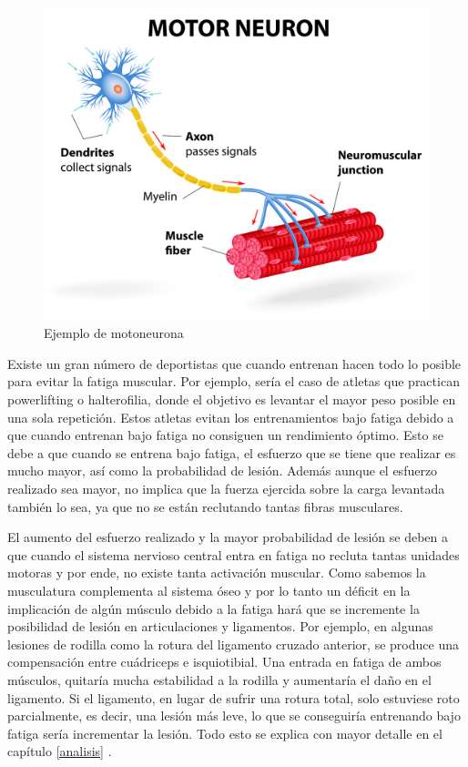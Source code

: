 \begin{figure}[ht]
\centering
\includegraphics[scale=0.25]{imagenes/motoneurona.jpg}
\vspace{-1.0cm}
\caption{ Ejemplo de motoneurona \cite{motoneurona1}}
\label{fig:motoneurona}
\end{figure}
Existe un gran número de deportistas que cuando entrenan hacen todo lo posible para evitar la fatiga muscular. Por ejemplo, sería el caso de atletas que practican powerlifting o halterofilia, donde el objetivo es levantar el mayor peso posible en una sola repetición. Estos atletas evitan los entrenamientos bajo fatiga debido a que cuando entrenan bajo fatiga no consiguen un rendimiento óptimo. Esto se debe a que cuando se entrena bajo fatiga, el esfuerzo que se tiene que realizar es mucho mayor, así como la probabilidad de lesión. Además aunque el esfuerzo realizado sea mayor, no implica que la fuerza ejercida sobre la carga levantada también lo sea, ya que no se están reclutando tantas fibras musculares.

El aumento del esfuerzo realizado y la mayor probabilidad de lesión se deben a que cuando el sistema nervioso central entra en fatiga no recluta tantas unidades motoras y por ende, no existe tanta activación muscular. Como sabemos la musculatura complementa al sistema óseo y por lo tanto un déficit en la implicación de algún músculo debido a la fatiga hará que se incremente la posibilidad de lesión en articulaciones y ligamentos. Por ejemplo, en algunas lesiones de rodilla como la rotura del ligamento cruzado anterior, se produce una compensación entre cuádriceps e isquiotibial. Una entrada en fatiga de ambos músculos, quitaría mucha estabilidad a la rodilla y aumentaría el daño en el ligamento. Si el ligamento, en lugar de sufrir una rotura total, solo estuviese roto parcialmente, es decir, una lesión más leve, lo que se conseguiría entrenando bajo fatiga sería incrementar la lesión.
Todo esto se explica con mayor detalle en el capítulo \ref{analisis} .

